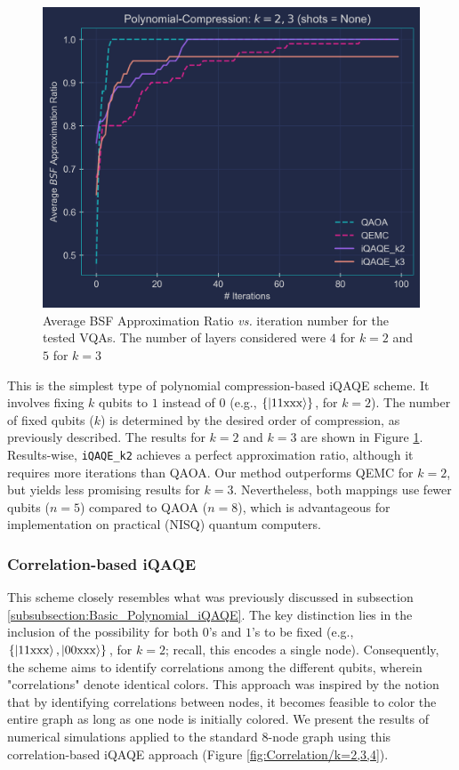 \begin{figure}[H]
    \centering
    \includegraphics[width=0.95\columnwidth]{Figures/Polynomial_Compression_Base_k2_k3_1.png}
    \caption{Average BSF Approximation Ratio \textit{vs.} iteration number for the tested VQAs. The number of layers considered were $4$ for $k = 2$ and $5$ for $k = 3$}
    \label{fig:Comparison_k2+k3_2}
\end{figure}

This is the simplest type of polynomial compression-based iQAQE scheme. It involves fixing $k$ qubits to $1$ instead of $0$ (e.g., $\{\ket{11\text{xxx}}\}$, for $k = 2$). The number of fixed qubits ($k$) is determined by the desired order of compression, as previously described. The results for $k = 2$ and $k = 3$ are shown in Figure \ref{fig:Comparison_k2+k3_2}. Results-wise, \texttt{iQAQE\_k2} achieves a perfect approximation ratio, although it requires more iterations than QAOA. Our method outperforms QEMC for $k = 2$, but yields less promising results for $k = 3$. Nevertheless, both mappings use fewer qubits ($n = 5$) compared to QAOA ($n = 8$), which is advantageous for implementation on practical (NISQ) quantum computers.

\subsubsection{Correlation-based iQAQE}
\label{subsubsection:Correlation_iQAQE}

This scheme closely resembles what was previously discussed in subsection \ref{subsubsection:Basic_Polynomial_iQAQE}. The key distinction lies in the inclusion of the possibility for both $0$'s and $1$'s to be fixed (e.g., $\{\ket{11\text{xxx}}, \ket{00\text{xxx}}\}$, for $k = 2$; recall, this encodes a single node). Consequently, the scheme aims to identify correlations among the different qubits, wherein "correlations" denote identical colors. This approach was inspired by the notion that by identifying correlations between nodes, it becomes feasible to color the entire graph as long as one node is initially colored. We present the results of numerical simulations applied to the standard $8$-node graph using this correlation-based iQAQE approach (Figure \ref{fig:Correlation/k=2,3,4}).

